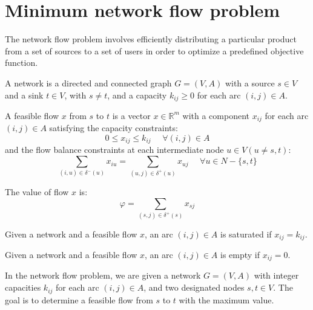 \section{Minimum network flow problem}

The network flow problem involves efficiently distributing a particular product from a set of sources to a set of users in order to optimize a predefined objective function.
\begin{definition}
    A network is a directed and connected graph $G = (V,A)$ with a source $s \in V$ and a sink $t \in V$, with $s \neq t$, and a capacity $k_{ij} \geq 0$ for each arc 
    $(i,j) \in A$. 
\end{definition}
\begin{definition}
    A feasible flow $x$ from $s$ to $t$ is a vector $x \in \mathbb{R}^m$ with a component $x_{ij}$ for each arc $(i,j) \in A$ satisfying the capacity constraints:
    \[0 \leq x_{ij} \leq k_{ij} \:\:\:\:\:\: \forall (i,j) \in A\]
    and the flow balance constraints at each intermediate node $u \in V (u \neq s,t)$: 
    \[\sum_{(i,u)\in \delta^{-}(u)}x_{iu}=\sum_{(u,j)\in \delta^{+}(u)}x_{uj} \:\:\:\:\:\: \forall u \in N-\{s,t\}\]
\end{definition}
\begin{definition}
    The value of flow $x$ is:
    \[\varphi = \sum_{(s,j) \in \delta^{+}(s)} x_{sj}\]
\end{definition}
\begin{definition}
    Given a network and a feasible flow $x$, an arc $(i,j) \in A$ is saturated if $x_{ij} = k_{ij}$. 
\end{definition}
\begin{definition}
    Given a network and a feasible flow $x$, an arc $(i,j) \in A$ is empty if $x_{ij} = 0$. 
\end{definition}
In the network flow problem, we are given a network $G = (V,A)$ with integer capacities $k_{ij}$ for each arc $(i,j) \in A$, and two designated nodes $s,t \in V$. 
The goal is to determine a feasible flow from $s$ to $t$ with the maximum value.

